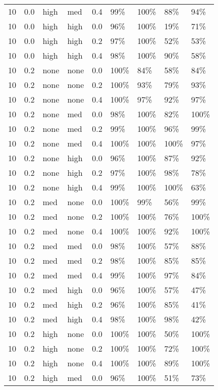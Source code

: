 \begin{longtable}{rrllrllll}
  10 & 0.0 & high & med & 0.4 & 99\% & 100\% & 88\% & 94\% \\ 
  10 & 0.0 & high & high & 0.0 & 96\% & 100\% & 19\% & 71\% \\ 
  10 & 0.0 & high & high & 0.2 & 97\% & 100\% & 52\% & 53\% \\ 
  10 & 0.0 & high & high & 0.4 & 98\% & 100\% & 90\% & 58\% \\ 
  10 & 0.2 & none & none & 0.0 & 100\% & 84\% & 58\% & 84\% \\ 
  10 & 0.2 & none & none & 0.2 & 100\% & 93\% & 79\% & 93\% \\ 
  10 & 0.2 & none & none & 0.4 & 100\% & 97\% & 92\% & 97\% \\ 
  10 & 0.2 & none & med & 0.0 & 98\% & 100\% & 82\% & 100\% \\ 
  10 & 0.2 & none & med & 0.2 & 99\% & 100\% & 96\% & 99\% \\ 
  10 & 0.2 & none & med & 0.4 & 100\% & 100\% & 100\% & 97\% \\ 
  10 & 0.2 & none & high & 0.0 & 96\% & 100\% & 87\% & 92\% \\ 
  10 & 0.2 & none & high & 0.2 & 97\% & 100\% & 98\% & 78\% \\ 
  10 & 0.2 & none & high & 0.4 & 99\% & 100\% & 100\% & 63\% \\ 
  10 & 0.2 & med & none & 0.0 & 100\% & 99\% & 56\% & 99\% \\ 
  10 & 0.2 & med & none & 0.2 & 100\% & 100\% & 76\% & 100\% \\ 
  10 & 0.2 & med & none & 0.4 & 100\% & 100\% & 92\% & 100\% \\ 
  10 & 0.2 & med & med & 0.0 & 98\% & 100\% & 57\% & 88\% \\ 
  10 & 0.2 & med & med & 0.2 & 98\% & 100\% & 85\% & 85\% \\ 
  10 & 0.2 & med & med & 0.4 & 99\% & 100\% & 97\% & 84\% \\ 
  10 & 0.2 & med & high & 0.0 & 96\% & 100\% & 57\% & 47\% \\ 
  10 & 0.2 & med & high & 0.2 & 96\% & 100\% & 85\% & 41\% \\ 
  10 & 0.2 & med & high & 0.4 & 98\% & 100\% & 98\% & 42\% \\ 
  10 & 0.2 & high & none & 0.0 & 100\% & 100\% & 50\% & 100\% \\ 
  10 & 0.2 & high & none & 0.2 & 100\% & 100\% & 72\% & 100\% \\ 
  10 & 0.2 & high & none & 0.4 & 100\% & 100\% & 89\% & 100\% \\ 
  10 & 0.2 & high & med & 0.0 & 96\% & 100\% & 51\% & 73\% \\ 

\end{longtable}
